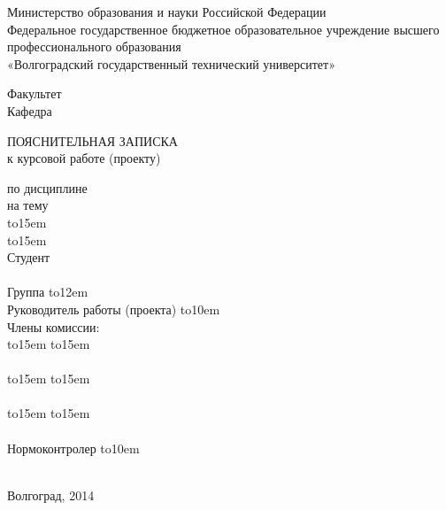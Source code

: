 \documentclass[a4paper,14pt]{extarticle} %
\begin{document}
\begin{titlepage}
\newpage
\begin{center}
Министерство образования и науки Российской Федерации\\
Федеральное государственное бюджетное образовательное учреждение высшего профессионального образования\\
 «Волгоградский государственный технический университет»
\end{center}
\def\hrf#1{\hbox to#1{\hrulefill}}
Факультет \hrulefill\\
Кафедра \hrulefill
\begin{center}
ПОЯСНИТЕЛЬНАЯ ЗАПИСКА\\
к курсовой работе (проекту)
\end{center}
по дисциплине \hrulefill\\
на тему \hrulefill\\
 \hrf{15em}\hrulefill\\
 \hrf{15em}\hrulefill\\
Студент\hrulefill\\
\raisebox{15pt}{\hspace{7cm} {\small (фамилия, имя, отчество)} }\\
\vskip -1.5cm
Группа \hrf{12em}\\
Руководитель работы (проекта)  \hrf{10em} \hspace{0.5cm} \hrulefill\\
\raisebox{15pt}{\hspace{7cm} {\small (подпись и дата подписания)} \hspace{0.3cm}{\small (инициалы и фамилия)} }
\vskip -0.5cm
Члены комиссии:\\
\hrf{15em} \hspace{1cm} \hrf{15em}\\
\raisebox{15pt}{\hspace{1cm} {\small (подпись и дата подписания)} \hspace{4cm}{\small (инициалы и фамилия)} }\\
\hrf{15em} \hspace{1cm} \hrf{15em}\\
\raisebox{15pt}{\hspace{1cm} {\small (подпись и дата подписания)} \hspace{4cm}{\small (инициалы и фамилия)} }\\
\hrf{15em} \hspace{1cm} \hrf{15em}\\
\raisebox{15pt}{\hspace{1cm} {\small (подпись и дата подписания)} \hspace{4cm}{\small (инициалы и фамилия)} }\\
\vskip -1cm
Нормоконтролер \hrf{10em} \hspace{1cm} \hrulefill\\
\raisebox{15pt}{\hspace{5cm} {\small (подпись, дата)} \hspace{4cm}{\small (инициалы и фамилия)} }\\
\begin{center}
\vskip -0.9cm
Волгоград, 2014
\end{center}
\end{titlepage}

	\tableofcontents
\end{document}
